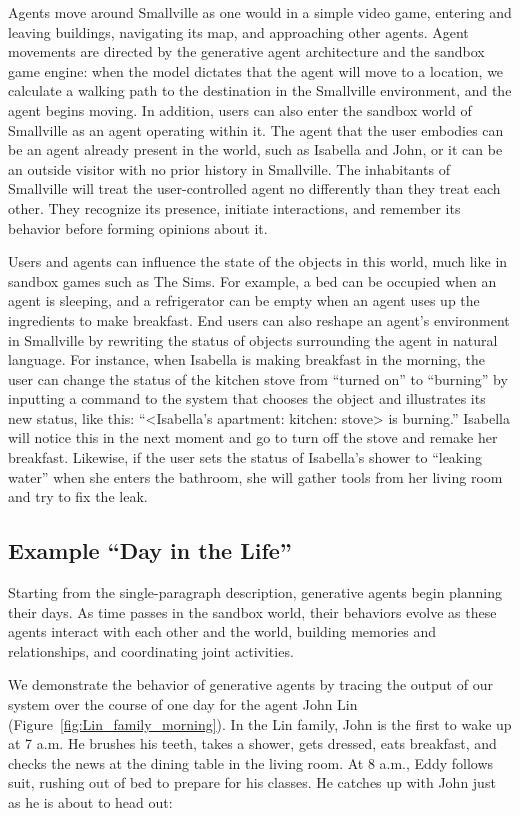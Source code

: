 Agents move around Smallville as one would in a simple video game, entering and leaving buildings, navigating its map, and approaching other agents. Agent movements are directed by the generative agent architecture and the sandbox game engine: when the model dictates that the agent will move to a location, we calculate a walking path to the destination in the Smallville environment, and the agent begins moving. In addition, users can also enter the sandbox world of Smallville as an agent operating within it. The agent that the user embodies can be an agent already present in the world, such as Isabella and John, or it can be an outside visitor with no prior history in Smallville. The inhabitants of Smallville will treat the user-controlled agent no differently than they treat each other. They recognize its presence, initiate interactions, and remember its behavior before forming opinions about it.

Users and agents can influence the state of the objects in this world, much like in sandbox games such as The Sims. For example, a bed can be occupied when an agent is sleeping, and a refrigerator can be empty when an agent uses up the ingredients to make breakfast. End users can also reshape an agent's environment in Smallville by rewriting the status of objects surrounding the agent in natural language. For instance, when Isabella is making breakfast in the morning, the user can change the status of the kitchen stove from “turned on” to “burning” by inputting a command to the system that chooses the object and illustrates its new status, like this: ``<Isabella's apartment: kitchen: stove> is burning.'' Isabella will notice this in the next moment and go to turn off the stove and remake her breakfast. Likewise, if the user sets the status of Isabella's shower to “leaking water” when she enters the bathroom, she will gather tools from her living room and try to fix the leak. 

\subsection{Example ``Day in the Life''} Starting from the single-paragraph description, generative agents begin planning their days. As time passes in the sandbox world, their behaviors evolve as these agents interact with each other and the world, building memories and relationships, and coordinating joint activities.

We demonstrate the behavior of generative agents by tracing the output of our system over the course of one day for the agent John Lin (Figure~\ref{fig:Lin_family_morning}). In the Lin family, John is the first to wake up at 7 a.m. He brushes his teeth, takes a shower, gets dressed, eats breakfast, and checks the news at the dining table in the living room. At 8 a.m., Eddy follows suit, rushing out of bed to prepare for his classes. He catches up with John just as he is about to head out:

